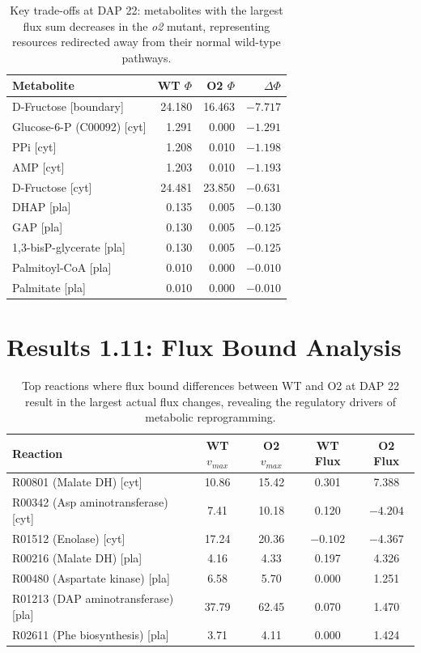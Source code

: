 \documentclass[11pt,letterpaper]{article}
\begin{document}
\begin{table}[H]
\centering
\caption{Key trade-offs at DAP 22: metabolites with the largest flux sum decreases in the \textit{o2} mutant, representing resources redirected away from their normal wild-type pathways.}
\label{stab:tradeoffs}
\small
\begin{tabular}{lrrr}
\toprule
Metabolite & WT $\Phi$ & O2 $\Phi$ & $\Delta\Phi$ \\
\midrule
D-Fructose [boundary]          & 24.180 & 16.463 & $-7.717$ \\
Glucose-6-P (C00092) [cyt]     & 1.291  & 0.000  & $-1.291$ \\
PPi [cyt]                      & 1.208  & 0.010  & $-1.198$ \\
AMP [cyt]                      & 1.203  & 0.010  & $-1.193$ \\
D-Fructose [cyt]               & 24.481 & 23.850 & $-0.631$ \\
DHAP [pla]                     & 0.135  & 0.005  & $-0.130$ \\
GAP [pla]                      & 0.130  & 0.005  & $-0.125$ \\
1,3-bisP-glycerate [pla]       & 0.130  & 0.005  & $-0.125$ \\
Palmitoyl-CoA [pla]            & 0.010  & 0.000  & $-0.010$ \\
Palmitate [pla]                & 0.010  & 0.000  & $-0.010$ \\
\bottomrule
\end{tabular}
\end{table}

\clearpage


\section{Results 1.11: Flux Bound Analysis}

\begin{table}[H]
\centering
\caption{Top reactions where flux bound differences between WT and O2 at DAP 22 result in the largest actual flux changes, revealing the regulatory drivers of metabolic reprogramming.}
\label{stab:bound_impacts}
\small
\begin{tabular}{lcccc}
\toprule
Reaction & WT $v_{max}$ & O2 $v_{max}$ & WT Flux & O2 Flux \\
\midrule
R00801 (Malate DH) [cyt]       & 10.86 & 15.42 & 0.301  & 7.388  \\
R00342 (Asp aminotransferase) [cyt] & 7.41  & 10.18 & 0.120  & $-4.204$ \\
R01512 (Enolase) [cyt]         & 17.24 & 20.36 & $-0.102$ & $-4.367$ \\
R00216 (Malate DH) [pla]       & 4.16  & 4.33  & 0.197  & 4.326  \\
R00480 (Aspartate kinase) [pla] & 6.58  & 5.70  & 0.000  & 1.251  \\
R01213 (DAP aminotransferase) [pla] & 37.79 & 62.45 & 0.070  & 1.470  \\
R02611 (Phe biosynthesis) [pla] & 3.71  & 4.11  & 0.000  & 1.424  \\
\bottomrule
\end{tabular}
\end{table}
\end{document}
